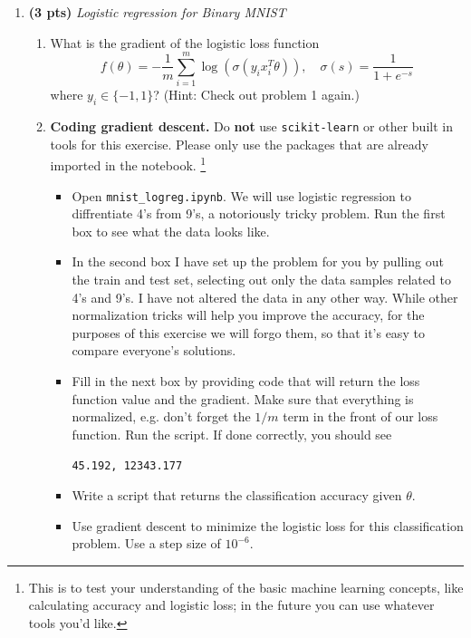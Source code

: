 \documentclass{article}
\newcommand{\showpoints}[1]{\textbf{(#1)}}
\begin{document}
\begin{enumerate}
\item \showpoints{3 pts} \emph{Logistic regression for Binary MNIST} 
\begin{enumerate}
\item 
What is the gradient of the logistic loss function 
\[
f(\theta) = -\frac{1}{m}\sum_{i=1}^m \log(\sigma(y_ix_i^T\theta)), \quad \sigma(s) = \frac{1}{1+e^{-s}}
\]
where $y_i \in \{-1,1\}$? (Hint: Check out problem 1 again.)






\item \textbf{Coding gradient descent.}  Do \textbf{not} use  \texttt{scikit-learn} or other built in tools for this exercise. Please only use the packages that are already imported in the notebook. \footnote{This is to test your understanding of the basic machine learning concepts, like calculating accuracy and logistic loss; in the future you can use whatever tools you'd like.}

\begin{itemize}
\item Open \texttt{mnist\_logreg.ipynb}. We will use logistic regression to diffrentiate 4's from 9's, a notoriously tricky problem.
Run the first box to see what the data looks like.

\item In the second box I have set up the problem for you by pulling out the train and test set, selecting out only the data samples related to 4's and 9's. I have not altered the data in any other way. While other normalization tricks will help you improve the accuracy, for the purposes of this exercise we will forgo them, so that it's easy to compare everyone's solutions. 


 
\item Fill in the next box by providing code that will return the loss function value and the gradient. Make sure that everything is normalized, e.g. don't forget the $1/m$ term in the front of our loss function. Run the script.
If done correctly, you should see 
\begin{center}
\texttt{45.192, 12343.177}
\end{center}

\item Write a script that returns the classification accuracy given $\theta$. 
\item Use gradient descent to minimize the logistic loss for this classification problem. Use a step size of $10^{-6}$.


\end{itemize}
\end{enumerate}
\end{enumerate}
\end{document}
